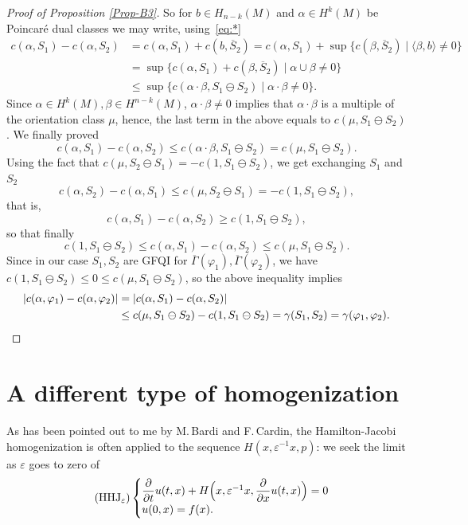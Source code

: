\documentclass[JEP,XML,SOM,NoFloatCountersInSection,Unicode,published]{cedram}
\newcommand{\HHJ}{\mathrm{HHJ}}
\numberwithin{equation}{section}
\newcommand{\GFQI}{\textup{GFQI}\xspace}
\theoremstyle{plain}
\theoremstyle{definition}
\theoremstyle{remark}
\begin{document}
\begin{proof}[Proof of Proposition \ref{Prop-B3}]
So for $b \in H_{n-k}(M)$ and $\alpha \in H^k(M)$ be Poincaré dual classes
we may write, using~\eqref{eq:*}
\begin{align*}
c(\alpha,S_{1})-c(\alpha,S_{2})&= c(\alpha,S_{1})+ c(b,\overline S_{2}) =c(\alpha,S_{1})+\sup\{c(\beta,\overline S_{2}) \mid \langle \beta, b \rangle\neq 0\}\\
&=\sup\{c(\alpha,S_{1})+c(\beta,\overline S_{2}) \mid \alpha\cup \beta \neq 0\}\\
&\leq \sup \{ c(\alpha\cdot \beta, S_{1}\ominus S_{2}) \mid \alpha\cdot \beta \neq 0\}.
\end{align*}
Since $\alpha\in H^{k}(M), \beta \in H^{n-k}(M)$, $\alpha\cdot \beta\neq 0$ implies that $\alpha\cdot \beta $ is a multiple of the orientation class $\mu$, hence, the last term in the above equals to $c(\mu, S_{1}\ominus S_{2})$.
We finally proved
\[
c(\alpha,S_{1})-c(\alpha,S_{2}) \leq c(\alpha\cdot \beta, S_{1}\ominus S_{2})=c(\mu, S_{1}\ominus S_{2}).
\]
Using the fact that $c(\mu, S_{2}\ominus S_{1})=-c(1,S_{1}\ominus S_{2})$, we get exchanging $S_1$ and $S_2$
\[
c(\alpha,S_{2})-c(\alpha,S_{1}) \leq c(\mu, S_{2}\ominus S_{1})= - c(1, S_1\ominus S_2),
\]
that is,
\[
c(\alpha,S_{1})-c(\alpha,S_{2}) \geq c(1, S_{1}\ominus S_{2}),
\]
so that finally
\[
c(1,S_{1}\ominus S_{2}) \leq c(\alpha,S_{1})-c(\alpha,S_{2}) \leq c(\mu, S_{1}\ominus S_{2}).
\]
Since in our case $S_1, S_2$ are \GFQI for $\overline\Gamma (\varphi_1), \overline \Gamma(\varphi_2)$, we have
$c(1, S_1\ominus S_2) \leq 0 \leq c(\mu, S_{1}\ominus S_{2})$, so the above inequality implies
\begin{align*}
\vert c(\alpha,\varphi_{1})-c(\alpha,\varphi_{2})\vert &=\vert c(\alpha,S_{1})-c(\alpha,S_{2}) \vert\\
& \leq c(\mu, S_{1}\ominus S_{2})-c(1,S_{1}\ominus S_{2})=\gamma(S_{1},S_{2})=\gamma (\varphi_1,\varphi_2).\qedhere
\end{align*}
\end{proof}

\section{A different type of homogenization}
As has been pointed out to me by M.\,Bardi and F.\,Cardin, the Hamilton-Jacobi homogenization is often applied to the sequence $H(x, \varepsilon ^{-1}x,p)$: we seek the limit as $ \varepsilon $ goes to zero of
\begin{equation}
\tag{$\HHJ_{ \varepsilon }$}
\begin{cases}
\dfrac{\partial}{\partial t} u (t,x) + H \Bigl(x, \varepsilon ^{-1}x, \dfrac{\partial}{\partial x}u (t,x)\Bigr) = 0\\
u (0,x) = f(x).
\end{cases}
\end{equation}
\end{document}
